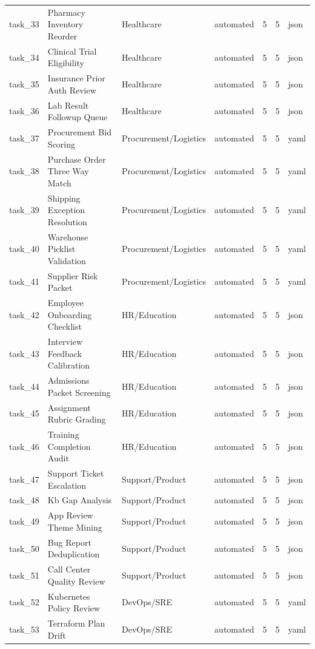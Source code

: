 \documentclass[11pt]{article}
\begin{document}
\begin{longtable}{L{0.09\textwidth}L{0.30\textwidth}L{0.25\textwidth}L{0.10\textwidth}L{0.07\textwidth}L{0.07\textwidth}L{0.08\textwidth}}
task\_33 & Pharmacy Inventory Reorder & Healthcare & automated & 5 & 5 & json \\
task\_34 & Clinical Trial Eligibility & Healthcare & automated & 5 & 5 & json \\
task\_35 & Insurance Prior Auth Review & Healthcare & automated & 5 & 5 & json \\
task\_36 & Lab Result Followup Queue & Healthcare & automated & 5 & 5 & json \\
task\_37 & Procurement Bid Scoring & Procurement/Logistics & automated & 5 & 5 & yaml \\
task\_38 & Purchase Order Three Way Match & Procurement/Logistics & automated & 5 & 5 & yaml \\
task\_39 & Shipping Exception Resolution & Procurement/Logistics & automated & 5 & 5 & yaml \\
task\_40 & Warehouse Picklist Validation & Procurement/Logistics & automated & 5 & 5 & yaml \\
task\_41 & Supplier Risk Packet & Procurement/Logistics & automated & 5 & 5 & yaml \\
task\_42 & Employee Onboarding Checklist & HR/Education & automated & 5 & 5 & json \\
task\_43 & Interview Feedback Calibration & HR/Education & automated & 5 & 5 & json \\
task\_44 & Admissions Packet Screening & HR/Education & automated & 5 & 5 & json \\
task\_45 & Assignment Rubric Grading & HR/Education & automated & 5 & 5 & json \\
task\_46 & Training Completion Audit & HR/Education & automated & 5 & 5 & json \\
task\_47 & Support Ticket Escalation & Support/Product & automated & 5 & 5 & json \\
task\_48 & Kb Gap Analysis & Support/Product & automated & 5 & 5 & json \\
task\_49 & App Review Theme Mining & Support/Product & automated & 5 & 5 & json \\
task\_50 & Bug Report Deduplication & Support/Product & automated & 5 & 5 & json \\
task\_51 & Call Center Quality Review & Support/Product & automated & 5 & 5 & json \\
task\_52 & Kubernetes Policy Review & DevOps/SRE & automated & 5 & 5 & yaml \\
task\_53 & Terraform Plan Drift & DevOps/SRE & automated & 5 & 5 & yaml \\

\end{longtable}
\end{document}
